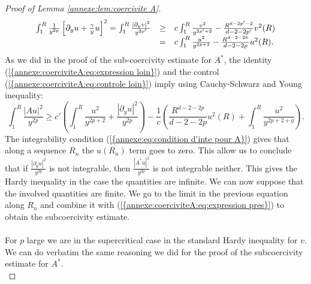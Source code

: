 \documentclass[11pt,a4paper,reqno]{amsart}
\theoremstyle{remark}
\numberwithin{equation}{section}
\begin{document}
\begin{appendix}
\begin{proof}[Proof of Lemma \ref{annexe:lem:coercivite A}]
\begin{equation} \label{annexe:coerciviteA:eq:controle loin}
\begin{array}{r c l}
\int_1^R \frac{1}{y^{2p}}\left[ \partial_y u +\frac{\gamma}{y}u\right]^2 = \int_1^R \frac{|\partial_y v|^2}{y^{2p'}} &\geq & c\int_1^R \frac{v^2}{y^{2p'+2}}-\frac{R^{d-2p'-2}}{d-2-2p'}v^2(R) \\
&=& c\int_1^R \frac{u^2}{y^{2p+2}}-\frac{R^{d-2-2k}}{d-2-2p}u^2(R) .
\end{array}
\end{equation}
As we did in the proof of the sub-coercivity estimate for $A^*$, the identity {{\rm (\ref{{annexe:coerciviteA:eq:expression loin}})}} and the control {{\rm (\ref{{annexe:coerciviteA:eq:controle loin}})}} imply using Cauchy-Schwarz and Young inequality:
$$
\int_1^R \frac{|Au|^2}{y^{2p}} \geq c'\left( \int_1^R \frac{u^2}{y^{2p+2}}+\frac{|\partial_y u|^2}{y^{2p}}\right) -\frac{1}{c}\left(\frac{R^{d-2-2p}}{d-2-2p}u^2(R) +\int_1^R \frac{u^2}{y^{2p+2+g}} \right).
$$
The integrability condition {{\rm (\ref{{annexe:eq:condition d'inte pour A}})}} gives that along a sequence $R_n$ the $u(R_n)$ term goes to zero. This allow us to conclude that if $\frac{|\partial_y u|^2}{y^{2p}}$ is not integrable, then $\frac{|A^*u|^2}{y^{2p}}$ is not integrable neither. This gives the Hardy inequality in the case the quantities are infinite. We can now suppose that the involved quantities are finite. We go to the limit in the previous equation along $R_n$ and combine it with {{\rm (\ref{{annexe:coerciviteA:eq:expression pres}})}} to obtain the subcoercivity estimate.\\
\\
For $p$ large we are in the supercritical case in the standard Hardy inequality for $v$. We can do verbatim the same reasoning we did for the proof of the subcoercivity estimate for $A^*$.\\


\end{proof}
\end{appendix}
\end{document}
